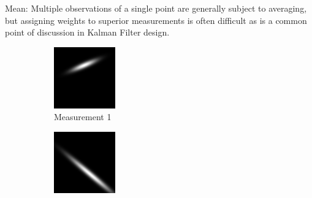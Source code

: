 \documentclass[a4paper, 11pt, titlepage]{article}
\begin{document}
      Mean:
      Multiple observations of a single point are generally subject to averaging, but assigning weights to superior measurements is often difficult as is a common point of discussion in Kalman Filter design.
      \begin{figure}
      \centering
      \begin{subfigure}{.3\textwidth}
        \centering
        \includegraphics[width=.8\linewidth]{images/GaussianLine1.png}
        \caption{Measurement 1}
        \label{fig:uncProdsub1}
      \end{subfigure}%
      \begin{subfigure}{.3\textwidth}
        \centering
        \includegraphics[width=.8\linewidth]{images/GaussianLine2.png}

\end{subfigure}
\end{figure}
\end{document}
